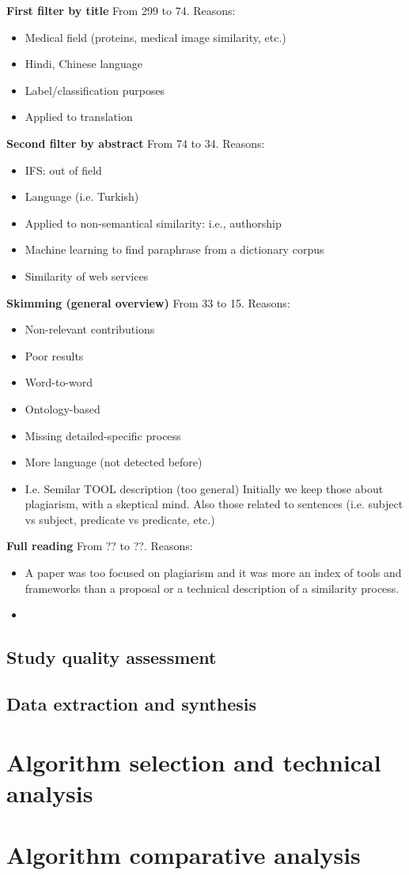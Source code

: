 \textbf{First filter by title}
From 299 to 74. Reasons:
\begin{itemize}
\item Medical field (proteins, medical image similarity, etc.)
\item Hindi, Chinese language
\item Label/classification purposes
\item Applied to translation
\end{itemize}
\textbf{Second filter by abstract}
From 74 to 34. Reasons:
\begin{itemize}
\item IFS: out of field
\item Language (i.e. Turkish)
\item Applied to non-semantical similarity: i.e., authorship
\item Machine learning to find paraphrase from a dictionary corpus
\item Similarity of web services
\end{itemize}
\textbf{Skimming (general overview)}
From 33 to 15. 
Reasons:
\begin{itemize}
\item Non-relevant contributions
\item Poor results
\item Word-to-word
\item Ontology-based
\item Missing detailed-specific process
\item More language (not detected before)
\item I.e. Semilar TOOL description (too general)
Initially we keep those about plagiarism, with a skeptical mind. Also those related to sentences (i.e. subject vs subject, predicate vs predicate, etc.)
\end{itemize}
\textbf{Full reading}
From ?? to ??. Reasons:
\begin{itemize}
\item A paper was too focused on plagiarism and it was more an index of tools and frameworks than a proposal or a technical description of a similarity process.
\item 
\end{itemize}

\subsection{Study quality assessment}

\subsection{Data extraction and synthesis}

\section{Algorithm selection and technical analysis}

\section{Algorithm comparative analysis}


